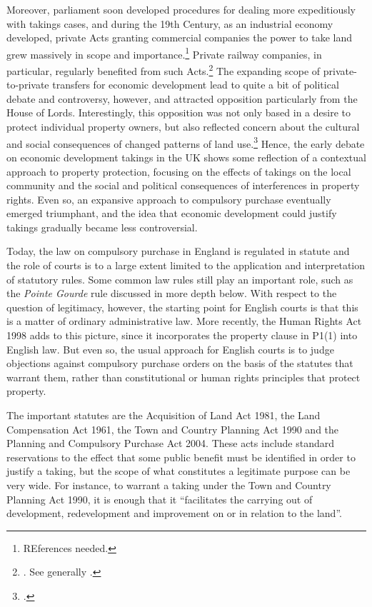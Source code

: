 Moreover, parliament soon developed procedures for dealing more expeditiously with takings cases, and during the 19th Century, as an industrial economy developed, private Acts granting commercial companies the power to take land grew massively in scope and importance.\footnote{REferences needed.} Private railway companies, in particular, regularly benefited from such Acts.\footnote{\cite[204]{allen00}. See generally \cite{kostal97}.} The expanding scope of private-to-private transfers for economic development lead to quite a bit of political debate and controversy, however, and attracted opposition particularly from the House of Lords. Interestingly, this opposition was not only based in a desire to protect individual property owners, but also reflected concern about the cultural and social consequences of changed patterns of land use.\footcite[204]{allen} Hence, the early debate on economic development takings in the UK shows some reflection of a contextual approach to property protection, focusing on the effects of takings on the local community and the social and political consequences of interferences in property rights. Even so, an expansive approach to compulsory purchase eventually emerged triumphant, and the idea that economic development could justify takings gradually became less controversial.

Today, the law on compulsory purchase in England is regulated in statute and the role of courts is to a large extent limited to the application and interpretation of statutory rules. Some common law rules still play an important role, such as the {\it Pointe Gourde} rule discussed in more depth below. With respect to the question of legitimacy, however, the starting point for English courts is that this is a matter of ordinary administrative law. More recently, the Human Rights Act 1998 adds to this picture, since it incorporates the property clause in P1(1) into English law. But even so, the usual approach for English courts is to judge objections against compulsory purchase orders on the basis of the statutes that warrant them, rather than constitutional or human rights principles that protect property.

The important statutes are the Acquisition of Land Act 1981, the Land Compensation Act 1961, the Town and Country Planning Act 1990 and the Planning and Compulsory Purchase Act 2004. These acts include standard reservations to the effect that some public benefit must be identified in order to justify a taking, but the scope of what constitutes a legitimate purpose can be very wide. For instance, to warrant a taking under the Town and Country Planning Act 1990, it is enough that it ``facilitates the carrying out of development, redevelopment and improvement on or in relation to the land''. 

